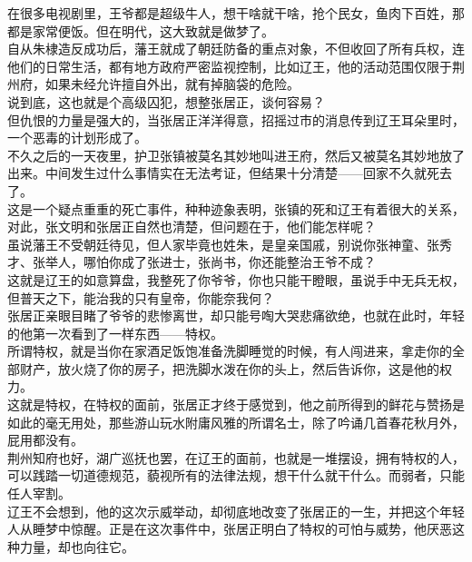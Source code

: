 \begin{multicols}{\theparacolNo}
在很多电视剧里，王爷都是超级牛人，想干啥就干啥，抢个民女，鱼肉下百姓，那都是家常便饭。但在明代，这大致就是做梦了。\\

自从朱棣造反成功后，藩王就成了朝廷防备的重点对象，不但收回了所有兵权，连他们的日常生活，都有地方政府严密监视控制，比如辽王，他的活动范围仅限于荆州府，如果未经允许擅自外出，就有掉脑袋的危险。\\

说到底，这也就是个高级囚犯，想整张居正，谈何容易？\\

但仇恨的力量是强大的，当张居正洋洋得意，招摇过市的消息传到辽王耳朵里时，一个恶毒的计划形成了。\\

不久之后的一天夜里，护卫张镇被莫名其妙地叫进王府，然后又被莫名其妙地放了出来。中间发生过什么事情实在无法考证，但结果十分清楚——回家不久就死去了。\\

这是一个疑点重重的死亡事件，种种迹象表明，张镇的死和辽王有着很大的关系，对此，张文明和张居正自然也清楚，但问题在于，他们能怎样呢？\\

虽说藩王不受朝廷待见，但人家毕竟也姓朱，是皇亲国戚，别说你张神童、张秀才、张举人，哪怕你成了张进士，张尚书，你还能整治王爷不成？\\

这就是辽王的如意算盘，我整死了你爷爷，你也只能干瞪眼，虽说手中无兵无权，但普天之下，能治我的只有皇帝，你能奈我何？\\

张居正亲眼目睹了爷爷的悲惨离世，却只能号啕大哭悲痛欲绝，也就在此时，年轻的他第一次看到了一样东西——特权。\\

所谓特权，就是当你在家酒足饭饱准备洗脚睡觉的时候，有人闯进来，拿走你的全部财产，放火烧了你的房子，把洗脚水泼在你的头上，然后告诉你，这是他的权力。\\

这就是特权，在特权的面前，张居正才终于感觉到，他之前所得到的鲜花与赞扬是如此的毫无用处，那些游山玩水附庸风雅的所谓名士，除了吟诵几首春花秋月外，屁用都没有。\\

荆州知府也好，湖广巡抚也罢，在辽王的面前，也就是一堆摆设，拥有特权的人，可以践踏一切道德规范，藐视所有的法律法规，想干什么就干什么。而弱者，只能任人宰割。\\

辽王不会想到，他的这次示威举动，却彻底地改变了张居正的一生，并把这个年轻人从睡梦中惊醒。正是在这次事件中，张居正明白了特权的可怕与威势，他厌恶这种力量，却也向往它。\\


\end{multicols}
